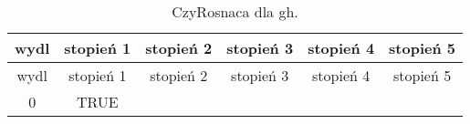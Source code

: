 \documentclass[]{article}
\begin{document}
\begin{longtable}[c]{@{}cccccc@{}}
\caption{CzyRosnaca dla gh.}\tabularnewline
\toprule
\begin{minipage}[b]{0.08\columnwidth}\centering\strut
wydl
\strut\end{minipage} &
\begin{minipage}[b]{0.14\columnwidth}\centering\strut
stopień 1
\strut\end{minipage} &
\begin{minipage}[b]{0.14\columnwidth}\centering\strut
stopień 2
\strut\end{minipage} &
\begin{minipage}[b]{0.14\columnwidth}\centering\strut
stopień 3
\strut\end{minipage} &
\begin{minipage}[b]{0.14\columnwidth}\centering\strut
stopień 4
\strut\end{minipage} &
\begin{minipage}[b]{0.14\columnwidth}\centering\strut
stopień 5
\strut\end{minipage}\tabularnewline
\midrule
\endfirsthead
\toprule
\begin{minipage}[b]{0.08\columnwidth}\centering\strut
wydl
\strut\end{minipage} &
\begin{minipage}[b]{0.14\columnwidth}\centering\strut
stopień 1
\strut\end{minipage} &
\begin{minipage}[b]{0.14\columnwidth}\centering\strut
stopień 2
\strut\end{minipage} &
\begin{minipage}[b]{0.14\columnwidth}\centering\strut
stopień 3
\strut\end{minipage} &
\begin{minipage}[b]{0.14\columnwidth}\centering\strut
stopień 4
\strut\end{minipage} &
\begin{minipage}[b]{0.14\columnwidth}\centering\strut
stopień 5
\strut\end{minipage}\tabularnewline
\midrule
\endhead
\begin{minipage}[t]{0.08\columnwidth}\centering\strut
0
\strut\end{minipage} &
\begin{minipage}[t]{0.14\columnwidth}\centering\strut
TRUE
\strut\end{minipage} &
\begin{minipage}[t]{0.14\columnwidth}\centering\strut

\end{minipage}
\end{longtable}
\end{document}
